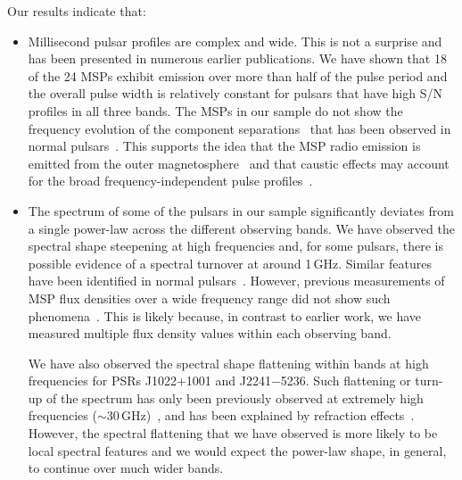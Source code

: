 \documentclass[useAMS,usenatbib]{mn2e}
\begin{document}
Our results indicate that:
\begin{itemize}

\item Millisecond pulsar profiles are complex and wide. This is not a surprise and has been presented 
	in numerous earlier publications. We have shown that 18 of the 24 MSPs exhibit emission 
	over more than half of the pulse period and the overall pulse width is relatively constant for 
	pulsars that have high S/N profiles in all three bands. The MSPs in our sample do not show the frequency
	evolution of the component separations~\citep{Kramer99} that has been observed in normal pulsars~\citep[e.g.,][]{Cordes78,Thorsett91}.
	This supports the idea that the MSP radio emission is emitted from the outer magnetosphere~\citep{Manchester05,Ravi10} 
	and that caustic effects may account for the broad frequency-independent pulse profiles~\citep{Dyks03,Watters09}.
	
\item The spectrum of some of the pulsars in our sample significantly deviates from a single power-law across 
	the different observing bands. We have observed the spectral shape steepening at high frequencies and, for some pulsars, there is possible evidence of a spectral 
	turnover at around 1\,GHz. Similar features have been identified in normal pulsars~\citep[e.g.,][]{Maron00,Kijak11}.  
	However, previous measurements of MSP flux densities over a wide frequency range did not show such phenomena~\citep{Kramer99,Kuzmin01}.  This is likely because, in contrast to earlier work, we have measured multiple flux density values within each observing band.
	
	
	We have also observed the spectral shape flattening within 
	bands at high frequencies for PSRs J1022$+$1001 and J2241$-$5236. Such flattening or turn-up of the spectrum 
	has only been previously observed at extremely high frequencies ($\sim30$\,GHz)~\citep{Kramer96}, and has been 
	explained by refraction effects~\citep{Petrova02}. However, the spectral flattening that we have observed is more likely to 
	be local spectral features and we would expect the power-law shape,  in general, to continue over much wider bands.
	

\end{itemize}
\end{document}
